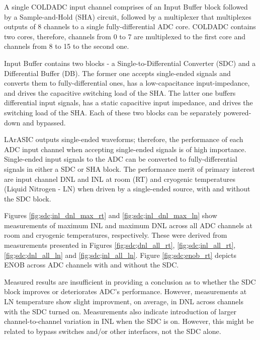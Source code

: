 \label{sec:5.5}


A single COLDADC input channel comprises of an Input Buffer block followed by a Sample-and-Hold (SHA) circuit, followed by a multiplexer that multiplexes outputs of 8 channels to a single fully-differential ADC core. COLDADC contains two cores, therefore, channels from 0 to 7 are multiplexed to the first core and channels from 8 to 15 to the second one.

Input Buffer contains two blocks - a Single-to-Differential Converter (SDC) and a Differential Buffer (DB). The former one accepts single-ended signals and converts them to fully-differential ones, has a low-capacitance input-impedance, and drives the capacitive switching load of the SHA. The latter one buffers differential input signals, has a static capacitive input impedance, and drives the switching load of the SHA. Each of these two blocks can be separately powered-down and bypassed.

LArASIC outputs single-ended waveforms; therefore, the performance of each ADC input channel when accepting single-ended signals is of high importance. Single-ended input signals to the ADC can be converted to fully-differential signals in either a SDC or SHA block. The performance merit of primary interest are input channel DNL and INL at room (RT) and cryogenic temperatures (Liquid Nitrogen - LN) when driven by a single-ended source, with and without the SDC block.

Figures \ref{fig;sdc;inl_dnl_max_rt} and \ref{fig;sdc;inl_dnl_max_ln} show measurements of maximum INL and maximum DNL across all ADC channels at room and cryogenic temperatures, respectively. These were derived from measurements presented in Figures \ref{fig;sdc;dnl_all_rt}, \ref{fig;sdc;inl_all_rt}, \ref{fig;sdc;dnl_all_ln} and \ref{fig;sdc;inl_all_ln}. Figure \ref{fig;sdc;enob_rt} depicts ENOB across ADC channels with and without the SDC.

Measured results are insufficient in providing a conclusion as to whether the SDC block improves or deteriorates ADC's performance. However, measurements at LN temperature show slight improvment, on average, in DNL across channels with the SDC turned on. Measurements also indicate introduction of larger channel-to-channel variation in INL when the SDC is on. However, this might be related to bypass switches and/or other interfaces, not the SDC alone.

